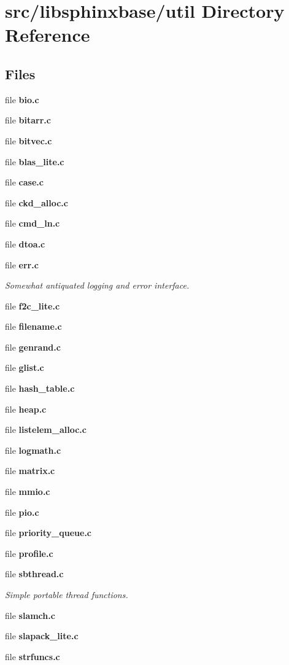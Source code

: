 \section{src/libsphinxbase/util Directory Reference}
\label{dir_dc1f04dceb148346198172cb52290701}
\subsection*{Files}
\begin{DoxyCompactItemize}
\item 
file {\bfseries bio.\-c}
\item 
file {\bfseries bitarr.\-c}
\item 
file {\bfseries bitvec.\-c}
\item 
file {\bfseries blas\-\_\-lite.\-c}
\item 
file {\bfseries case.\-c}
\item 
file {\bfseries ckd\-\_\-alloc.\-c}
\item 
file {\bfseries cmd\-\_\-ln.\-c}
\item 
file {\bfseries dtoa.\-c}
\item 
file {\bf err.\-c}
\begin{DoxyCompactList}\small\item\em Somewhat antiquated logging and error interface. \end{DoxyCompactList}\item 
file {\bfseries f2c\-\_\-lite.\-c}
\item 
file {\bfseries filename.\-c}
\item 
file {\bfseries genrand.\-c}
\item 
file {\bfseries glist.\-c}
\item 
file {\bfseries hash\-\_\-table.\-c}
\item 
file {\bfseries heap.\-c}
\item 
file {\bfseries listelem\-\_\-alloc.\-c}
\item 
file {\bfseries logmath.\-c}
\item 
file {\bfseries matrix.\-c}
\item 
file {\bfseries mmio.\-c}
\item 
file {\bfseries pio.\-c}
\item 
file {\bfseries priority\-\_\-queue.\-c}
\item 
file {\bfseries profile.\-c}
\item 
file {\bf sbthread.\-c}
\begin{DoxyCompactList}\small\item\em Simple portable thread functions. \end{DoxyCompactList}\item 
file {\bfseries slamch.\-c}
\item 
file {\bfseries slapack\-\_\-lite.\-c}
\item 
file {\bfseries strfuncs.\-c}
\end{DoxyCompactItemize}

